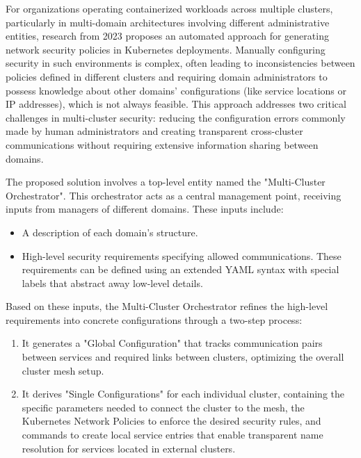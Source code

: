 For organizations operating containerized workloads across multiple clusters, particularly in multi-domain architectures involving different administrative entities, research from 2023 proposes an automated approach for generating network security policies in Kubernetes deployments\cite{bringhenti_security_2023}. Manually configuring security in such environments is complex, often leading to inconsistencies between policies defined in different clusters and requiring domain administrators to possess knowledge about other domains' configurations (like service locations or IP addresses), which is not always feasible\cite{bringhenti_security_2023}. This approach addresses two critical challenges in multi-cluster security: reducing the configuration errors commonly made by human administrators and creating transparent cross-cluster communications without requiring extensive information sharing between domains\cite{bringhenti_security_2023}.

The proposed solution involves a top-level entity named the "Multi-Cluster Orchestrator"\cite{bringhenti_security_2023}. This orchestrator acts as a central management point, receiving inputs from managers of different domains\cite{bringhenti_security_2023}. These inputs include:
\begin{itemize}
    \item A description of each domain's structure\cite{bringhenti_security_2023}.
    \item High-level security requirements specifying allowed communications\cite{bringhenti_security_2023}. These requirements can be defined using an extended YAML syntax with special labels that abstract away low-level details\cite{bringhenti_security_2023}.
\end{itemize}

Based on these inputs, the Multi-Cluster Orchestrator refines the high-level requirements into concrete configurations through a two-step process\cite{bringhenti_security_2023}:
\begin{enumerate}
    \item It generates a "Global Configuration" that tracks communication pairs between services and required links between clusters, optimizing the overall cluster mesh setup\cite{bringhenti_security_2023}.
    \item It derives "Single Configurations" for each individual cluster, containing the specific parameters needed to connect the cluster to the mesh, the Kubernetes Network Policies to enforce the desired security rules, and commands to create local service entries that enable transparent name resolution for services located in external clusters\cite{bringhenti_security_2023}.
\end{enumerate}

